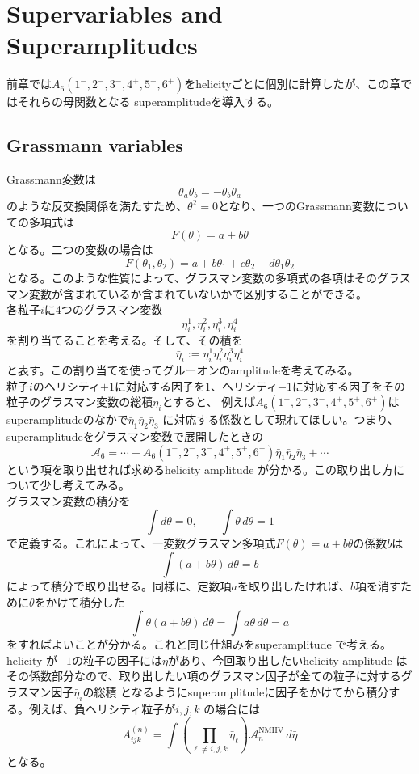\documentclass[uplatex,dvipdfmx,a4paper,11pt]{jsarticle}
\numberwithin{equation}{section}
\begin{document}
\section{Supervariables and Superamplitudes}
前章では\(A_6(1^-,2^-,3^-,4^+,5^+,6^+)\)をhelicityごとに個別に計算したが、この章ではそれらの母関数となる
superamplitudeを導入する。
\subsection{Grassmann variables}
Grassmann変数は
\[
\theta_a\theta_b=-\theta_b\theta_a
\]
のような反交換関係を満たすため、$\theta^2= 0$となり、一つのGrassmann変数についての多項式は
\[
F(\theta)=a+b\theta
\]
となる。二つの変数の場合は
\[
F(\theta_1,\theta_2)
=
a+b\theta_1+c\theta_2+d\theta_1\theta_2
\]
となる。このような性質によって、グラスマン変数の多項式の各項はそのグラスマン変数が含まれているか含まれていないかで区別することができる。\\
各粒子$i$に4つのグラスマン変数
\[
\eta_i^1,\eta_i^2,\eta_i^3,\eta_i^4
\]
を割り当てることを考える。そして、その積を
\[
\bar\eta_i
:=
\eta_i^1\eta_i^2\eta_i^3\eta_i^4
\]
と表す。この割り当てを使ってグルーオンのamplitudeを考えてみる。\\
粒子$i$のヘリシティ$+1$に対応する因子を$1$、ヘリシティ$-1$に対応する因子をその粒子のグラスマン変数の総積$\bar\eta_i$とすると、
例えば$A_6(1^-,2^-,3^-,4^+,5^+,6^+)$はsuperamplitudeのなかで$\bar\eta_1\bar\eta_2\bar\eta_3$
に対応する係数として現れてほしい。つまり、superamplitudeをグラスマン変数で展開したときの
\[
\mathcal A_6
=
\cdots+
A_6(1^-,2^-,3^-,4^+,5^+,6^+)
\bar\eta_1\bar\eta_2\bar\eta_3
+\cdots
\]
という項を取り出せれば求めるhelicity amplitude が分かる。この取り出し方について少し考えてみる。\\
グラスマン変数の積分を
\[
\int d\theta=0,
\qquad
\int\theta\,d\theta=1
\]
で定義する。これによって、一変数グラスマン多項式$F(\theta)=a+b\theta$の係数$b$は
\[
\int(a+b\theta)\,d\theta=b
\]
によって積分で取り出せる。同様に、定数項$a$を取り出したければ、$b$項を消すために$\theta$をかけて積分した
\[
\int\theta(a+b\theta)\,d\theta
=
\int a\theta\,d\theta
=
a
\]
をすればよいことが分かる。これと同じ仕組みをsuperamplitude で考える。\\
helicity が$-1$の粒子の因子には$\bar{\eta}$があり、今回取り出したいhelicity amplitude はその係数部分なので、取り出したい項のグラスマン因子が全ての粒子に対するグラスマン因子$\bar{\eta}_i$の総積
となるようにsuperamplitudeに因子をかけてから積分する。例えば、負ヘリシティ粒子が\(i,j,k\) の場合には
\begin{equation}
  A_{ijk}^{(n)}
=
\int
\left(
\prod_{\ell\neq i,j,k}\bar\eta_\ell
\right)
\mathcal A_n^{\mathrm{NMHV}}\,d\bar\eta
\end{equation}
となる。
\end{document}
